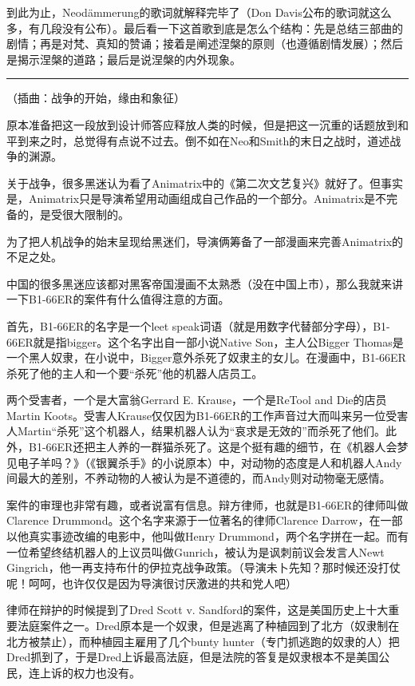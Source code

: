 \documentclass[UTF8]{ctexart}
\newcommand{\myparsep}{\noindent \rule[0.5ex]{\linewidth}{1pt}}
\begin{document}
到此为止，Neodämmerung的歌词就解释完毕了（Don Davis公布的歌词就这么多，有几段没有公布）。最后看一下这首歌到底是怎么个结构：先是总结三部曲的剧情；再是对梵、真知的赞诵；接着是阐述涅槃的原则（也遵循剧情发展）；然后是揭示涅槃的道路；最后是说涅槃的内外现象。

\myparsep

（插曲：战争的开始，缘由和象征）

原本准备把这一段放到设计师答应释放人类的时候，但是把这一沉重的话题放到和平到来之时，总觉得有点说不过去。倒不如在Neo和Smith的末日之战时，道述战争的渊源。

关于战争，很多黑迷认为看了Animatrix中的《第二次文艺复兴》就好了。但事实是，Animatrix只是导演希望用动画组成自己作品的一个部分。Animatrix是不完备的，是受很大限制的。

为了把人机战争的始末呈现给黑迷们，导演俩筹备了一部漫画来完善Animatrix的不足之处。

中国的很多黑迷应该都对黑客帝国漫画不太熟悉（没在中国上市），那么我就来讲一下B1-66ER的案件有什么值得注意的方面。

首先，B1-66ER的名字是一个leet speak词语（就是用数字代替部分字母），B1-66ER就是指bigger。这个名字出自一部小说Native Son，主人公Bigger Thomas是一个黑人奴隶，在小说中，Bigger意外杀死了奴隶主的女儿。在漫画中，B1-66ER杀死了他的主人和一个要“杀死”他的机器人店员工。

两个受害者，一个是大富翁Gerrard E. Krause，一个是ReTool and Die的店员Martin Koots。受害人Krause仅仅因为B1-66ER的工作声音过大而叫来另一位受害人Martin“杀死”这个机器人，结果机器人认为“哀求是无效的”而杀死了他们。此外，B1-66ER还把主人养的一群猫杀死了。这是个挺有趣的细节，在《机器人会梦见电子羊吗？》（《银翼杀手》的小说原本）中，对动物的态度是人和机器人Andy间最大的差别，不养动物的人被认为是不道德的，而Andy则对动物毫无感情。

案件的审理也非常有趣，或者说富有信息。辩方律师，也就是B1-66ER的律师叫做Clarence Drummond。这个名字来源于一位著名的律师Clarence Darrow，在一部以他真实事迹改编的电影中，他叫做Henry Drummond，两个名字拼在一起。而有一位希望终结机器人的上议员叫做Gunrich，被认为是讽刺前议会发言人Newt Gingrich，他一再支持布什的伊拉克战争政策。（导演未卜先知？那时候还没打仗呢！呵呵，也许仅仅是因为导演很讨厌激进的共和党人吧）

律师在辩护的时候提到了Dred Scott v. Sandford的案件，这是美国历史上十大重要法庭案件之一。Dred原本是一个奴隶，但是逃离了种植园到了北方（奴隶制在北方被禁止），而种植园主雇用了几个bunty hunter（专门抓逃跑的奴隶的人）把Dred抓到了，于是Dred上诉最高法庭，但是法院的答复是奴隶根本不是美国公民，连上诉的权力也没有。
\end{document}
